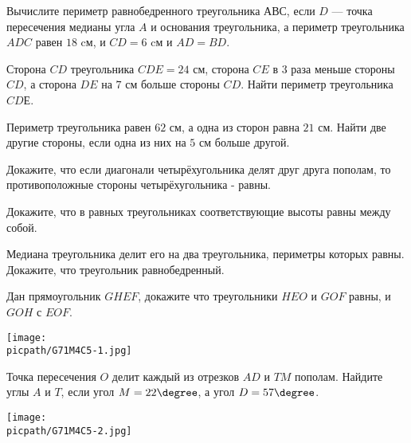 \begin{class}[number=6]
	\begin{listofex}
		\item Вычислите периметр равнобедренного треугольника \(АВС\), если \(D\) --- точка пересечения медианы угла \(A\) и основания треугольника, а периметр треугольника \(ADC\) равен \(18\) cм, и \(CD = 6\) cм и \(AD = BD\).
		\item Сторона \(CD\) треугольника \(CDE = 24\) см, сторона \(CE\) в \(3\) раза меньше стороны  \(CD\), а сторона \(DE\) на \(7\) см больше стороны \(CD\). Найти периметр треугольника  \(CDЕ\).
		\item Периметр треугольника равен \(62\) см, а одна из сторон равна \(21\) см. Найти две другие стороны, если одна из них на \(5\) см больше другой.
		\item Докажите, что если диагонали четырёхугольника делят друг друга пополам, то противоположные стороны четырёхугольника - равны.
		\item Докажите, что в равных треугольниках соответствующие высоты равны между собой.
		\item Медиана треугольника делит его на два треугольника, периметры которых равны. Докажите, что треугольник равнобедренный.
		\item
		\begin{minipage}[t]{\bodywidth}
			Дан прямоугольник \(GHEF\), докажите что треугольники \(HEO\) и \(GOF\) равны, и \(GOH\) с \(EOF\).
		\end{minipage}
		\hspace{0.03\linewidth}
		\begin{minipage}[c]{\picwidth}
			\texttt{[image: \\picpath/G71M4C5-1.jpg]}
		\end{minipage}
		\item Точка пересечения \( O \) делит каждый из отрезков \( AD \) и \( TM \) пополам. Найдите углы \(A\) и \(T\), если угол \(M = 22 \degree\), а угол \(D = 57 \degree\).
		\begin{center}
			\texttt{[image: \\picpath/G71M4C5-2.jpg]}
		\end{center}
	\end{listofex}
\end{class}
